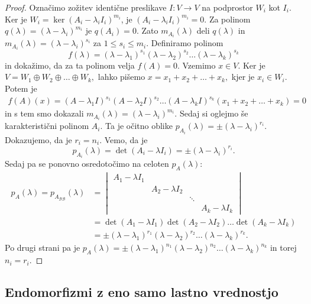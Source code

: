 \documentclass[10pt, a4paper]{article}
\newenvironment{noticeC}{%
  \tcolorbox[%
  notitle,
  empty,
  enhanced,  %
  breakable,
  coltext=black, 
  fontupper=\rmfamily,
  parbox=false,
  noparskip,
  sharp corners,
  boxrule=-1pt,  %
  frame hidden,
  left=7pt,  %
  right=7pt,
  top=5pt,
  bottom=5pt,
  before skip=2.5ex plus 2pt,
  after skip=2.5ex plus 2pt,
  overlay unbroken and last={%
  },
  ]}
{\endtcolorbox}
\newenvironment{dokaz}%
  {\begin{noticeC}\begin{proof}}%
  {\end{proof}\end{noticeC}}
\begin{document}
\begin{dokaz}
    Označimo zožitev identične preslikave $I: V \rightarrow V$ na podprostor $W_i$ kot $I_i$.
    Ker je $W_i = \ker (A_i - \lambda_i I_i)^{m_i}$, je $(A_i - \lambda_i I_i)^{m_i} = 0.$
    Za polinom $q(\lambda) = (\lambda - \lambda_i)^{m_i}$ je $q(A_i) = 0.$
    Zato $m_{A_i} (\lambda)$ deli $q(\lambda)$ in $m_{A_i} (\lambda) = (\lambda - \lambda_i)^{s_i}$ za $1 \leq s_i \leq m_i$.
    Definiramo polinom 
    $$f(\lambda) = (\lambda - \lambda_1)^{s_1} (\lambda - \lambda_2)^{s_2} \dots (\lambda - \lambda_k)^{s_k}$$
    in dokažimo, da za ta polinom velja $f(A) = 0.$
    Vzemimo $x \in V.$ Ker je $V = W_1 \oplus W_2 \oplus \dots \oplus W_k,$
    lahko pišemo $x = x_1 + x_2 + \dots + x_k,$ kjer je $x_i \in W_i$.
    Potem je 
    \begin{align*}
        f(A) (x) = (A - \lambda_1 I)^{s_1} (A - \lambda_2 I)^{s_2} \dots (A - \lambda_k I)^{s_k} (x_1 + x_2 + \dots + x_k) = 0
    \end{align*}
    in s tem smo dokazali $m_{A_i} (\lambda) = (\lambda - \lambda_i)^{m_i}$.
    Sedaj si oglejmo še karakteristični polinom $A_i$. Ta je očitno oblike $p_{A_i} (\lambda) = \pm (\lambda - \lambda_i)^{r_i}$.
    Dokazujemo, da je $r_i = n_i$.
    Vemo, da je $$p_{A_i} (\lambda) = \det (A_i - \lambda I_i) = \pm (\lambda - \lambda_i)^{r_i}.$$
    Sedaj pa se ponovno osredotočimo na celoten $p_A (\lambda)$:
    \begin{align*}
        p_A (\lambda) = p_{A_\mathcal{BB}} (\lambda) &= \begin{vmatrix}
        A_1 - \lambda I_1 & & & \\
         & A_2 - \lambda I_2 & & \\
         & & \ddots & \\
         & & & A_k - \lambda I_k
    \end{vmatrix}\\
    &= \det (A_1 - \lambda I_1) \det (A_2 - \lambda I_2) \dots \det (A_k - \lambda I_k)\\
    &= \pm (\lambda - \lambda_1)^{r_1} (\lambda - \lambda_2)^{r_2} \dots (\lambda - \lambda_k)^{r_k}.
    \end{align*}
    Po drugi strani pa je 
    $p_A (\lambda) = \pm (\lambda - \lambda_1)^{n_1} (\lambda - \lambda_2)^{n_2} \dots (\lambda - \lambda_k)^{n_k}$
    in torej $n_i = r_i.$
\end{dokaz}

\subsection{Endomorfizmi z eno samo lastno vrednostjo}
\end{document}
